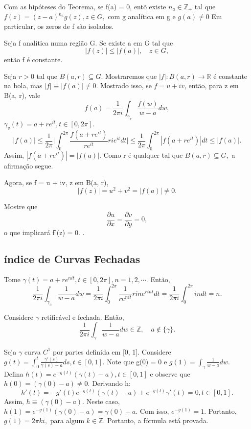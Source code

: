\documentclass[complex.tex]{subfiles}
\begin{document}
\begin{crl*}
	Com as hipóteses do Teorema, se f(a) = 0, entõ existe $n_a\in \mathbb{Z}_{+}$ tal que $f(z) = (z-a)^{n_a}g(z), z\in{G},$
	com g analítica em g e $g(a)\neq0$ Em particular, os zeros de f são isolados.
\end{crl*}
\begin{theorem*}
	Seja f analítica numa região G. Se existe a em G tal que
	$$
		|f(z)|\leq|f(a)|, \quad z\in{G},
	$$
	então f é constante.
\end{theorem*}
\begin{proof*}
	Seja $r > 0$ tal que $B(a, r)\subseteq{G}.$ Mostraremos que $|f|:B(a, r)\rightarrow \mathbb{R}$ é constante na bola, mas $|f|\equiv|f(a)|\neq0.$
	Mostrado isso, se $f = u + iv$, então, para z em B(a, r), vale
	$$
		f(a) = \frac{1}{2\pi i}\int_{\gamma_{v}}^{}\frac{f(w)}{w-a}dw,
	$$
	$\gamma_{v}(t) = a + re^{it}, t\in[0, 2\pi].$
	$$
		|f(a)|\leq \frac{1}{2\pi}\biggl|\int_{0}^{2\pi}\frac{f(a + re^{it})}{re^{it}}rie^{it}dt\biggr|\leq \frac{1}{2\pi}\int_{0}^{2\pi}|f(a + re^{it})|dt
		\leq |f(a)|.
	$$
	Assim, $|f(a+re^{it})| = |f(a)|.$ Como r é qualquer tal que $B(a, r)\subseteq{G},$ a afirmação segue.

	Agora, se f = u + iv, z em B(a, r),
	$$
		|f(z)| = u^{2} + v^{2} = |f(a)|\neq 0.
	$$
	\begin{exer*}
		Mostre que
		$$
			\frac{\partial{u}}{\partial{x}} = \frac{\partial{v}}{\partial{y}} = 0,
		$$
		o que implicará f'(z) = 0. \qedsymbol.
	\end{exer*}
\end{proof*}
\subsection{índice de Curvas Fechadas}
\begin{example}
	Tome $\gamma(t) = a + re^{nit}, t\in[0, 2\pi], n=1, 2, \cdots$. Então,
	$$
		\frac{1}{2\pi i}\int_{\gamma_{n}}^{}\frac{1}{w-a}dw = \frac{1}{2\pi  i}\int_{0}^{2\pi}\frac{1}{re^{nit}}rine^{rint}dt = \frac{1}{2\pi i}\int_{0}^{2\pi} indt = n.
	$$
\end{example}
\begin{prop*}
	Considere $\gamma$ retificável e fechada. Então,
	$$
		\frac{1}{2\pi i}\int_{\gamma}^{}\frac{1}{w-a}dw\in \mathbb{Z}, \quad a\not\in \{\gamma\}.
	$$
\end{prop*}
\begin{proof*}
	Seja $\gamma$ curva $C^{1}$ por partes definida em [0, 1]. Considere $g(t) = \int_{0}^{t}\frac{\gamma'(s)}{\gamma(s) - a}ds, t\in[0, 1].$
	Note que g(0) = 0 e $g(1) = \int_{\gamma}^{}\frac{1}{w-a}dw.$ Defina $h(t) = e^{-g(t)}(\gamma(t) - a), t\in[0, 1]$ e observe que
	$h(0) = (\gamma(0) - a)\neq0.$ Derivando h:
	$$
		h'(t) = -g'(t)e^{-g(t)}(\gamma(t) - a) + e^{-g(t)}\gamma'(t) = 0, t\in[0, 1].
	$$
	Assim, $h\equiv{(\gamma(0) - a)}$. Neste caso, $h(1) = e^{-g(1)}(\gamma(0)-a) = \gamma(0) - a.$ Com isso, $e^{-g(1)} = 1.$ Portanto,
	$g(1) = 2\pi ki,$ para algum $k\in \mathbb{Z}.$ Portanto, a fórmula está provada. \qedsymbol
\end{proof*}
\end{document}
